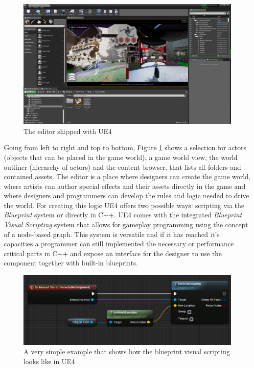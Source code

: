 \begin{figure}[!h]
	\includegraphics[width=\linewidth]{PICs/unreal_ed.png}
	\caption{The editor shipped with \ac{UE4}}
	\label{fig:unreal_ed}
\end{figure}

Going from left to right and top to bottom, Figure \ref{fig:unreal_ed} shows a selection for actors (objects that can be placed in the game world), a game world view, the world outliner (hierarchy of actors) and the content browser, that lists all folders and contained assets. The editor is a place where designers can create the game world, where artists can author special effects and their assets directly in the game
and where designers and programmers can develop the rules and logic needed to drive the world. For creating this logic \ac{UE4} offers two possible ways: scripting via the \textit{Blueprint} system or directly in C++. \ac{UE4} comes with the integrated \textit{Blueprint Visual Scripting} system that allows for gameplay programming using the concept of a node-based graph. This system is versatile and if it has reached it's capacities a programmer can still implemented the necessary or performance critical parts in C++ and expose an interface for the designer to use the component together with built-in blueprints.

\begin{figure}[h!]
	\includegraphics[width=\linewidth]{PICs/ue_blueprints.png}
	\caption{A very simple example that shows how the blueprint visual scripting looks like in \ac{UE4}}
	\label{fig:ue_blueprints}
\end{figure}

